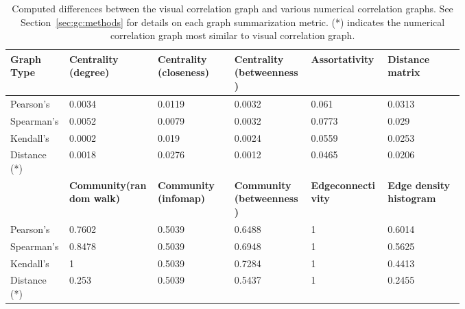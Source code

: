 \begin{landscape}
	\tablespacing
	\begin{longtable}{p{0.1\linewidth}p{0.15\linewidth}p{0.13\linewidth}
			p{0.13\linewidth}p{0.13\linewidth}p{0.13\linewidth} }
		
		\caption[Computed differences between the visual correlation graph and 
		various numerical correlation graphs.]{Computed differences between the 
		visual correlation graph and various numerical correlation graphs. See 
		Section~\ref{sec:gc:methods} for details on each graph 
		summarization metric. (*) indicates the numerical correlation graph 
		most similar to visual correlation graph.} 
		\label{tab:usage:graphdiff}\\
		\toprule
		\textbf{Graph Type} & \textbf{Centrality \newline (degree)} & 
		\textbf{Centrality \newline (closeness)} & 
		\textbf{Centrality \newline (betweenness)} & 
		\textbf{Assortativity} & \textbf{Distance \newline matrix} \\
		\midrule
		\endfirsthead
		
		\bottomrule
		\endlastfoot

		Pearson's & 0.0034 & 0.0119 & 0.0032 & 0.061 & 0.0313\\
		
		Spearman's & 0.0052 & 0.0079 & 0.0032 & 0.0773 & 0.029\\
		
		Kendall's & 0.0002 & 0.019 & 0.0024 & 0.0559 & 0.0253\\
		
		Distance (*) & 0.0018 & 0.0276 & 0.0012 & 0.0465 & 0.0206\\
		
		\midrule
		
		& \textbf{Community\newline (random walk)} & 
		\textbf{Community \newline (infomap)} & 
		\textbf{Community \newline (betweenness)} & 
		\textbf{Edge\newline connectivity} & 
		\textbf{Edge density \newline histogram} \\
		 	
		\midrule
		
		Pearson's & 0.7602 & 0.5039 & 0.6488 & 1 & 0.6014\\
		
		Spearman's & 0.8478 & 0.5039 & 0.6948 & 1 & 0.5625\\
		
		Kendall's & 1 & 0.5039 & 0.7284 & 1 & 0.4413\\
		
		Distance (*) & 0.253 & 0.5039 & 0.5437 & 1 & 0.2455\\
		
	\end{longtable}
	\bodyspacing
\end{landscape}





